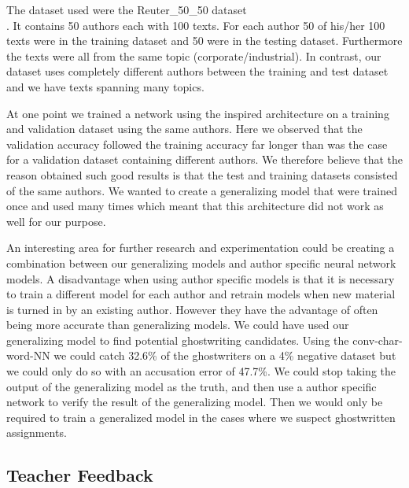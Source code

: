 The dataset \citet{qian:2018} used were the Reuter\_50\_50 dataset
\\\citep{Dua:2017}. It contains 50 authors each with 100 texts. For each
author 50 of his/her 100 texts were in the training dataset and 50 were in
the testing dataset. Furthermore the texts were all from the same topic
(corporate/industrial). In contrast, our dataset uses completely different
authors between the training and test dataset and we have texts spanning many
topics.


At one point we trained a network using the \citet{qian:2018} inspired
architecture on a training and validation dataset using the same authors. Here
we observed that the validation accuracy followed the training accuracy far
longer than was the case for a validation dataset containing different authors.
We therefore believe that the reason \citet{qian:2018} obtained such good
results is that the test and training datasets consisted of the same authors. We
wanted to create a generalizing model that were trained once and used many times
which meant that this architecture did not work as well for our purpose.

An interesting area for further research and experimentation could be creating
a combination between our generalizing models and author specific neural
network models. A disadvantage when using author specific models is that it
is necessary to train a different model for each author and retrain models
when new material is turned in by an existing author. However they have the
advantage of often being more accurate than generalizing models. We could have
used our generalizing model to find potential ghostwriting candidates. Using
the \gls{conv-char-word-NN} we could catch 32.6\% of the ghostwriters on a 4\%
negative dataset but we could only do so with an accusation error of 47.7\%. We
could stop taking the output of the generalizing model as the truth, and then
use a author specific network to verify the result of the generalizing model.
Then we would only be required to train a generalized model in the cases where
we suspect ghostwritten assignments.


\subsection{Teacher Feedback}\label{subsec:teacher_feedback_text_comparisons}

